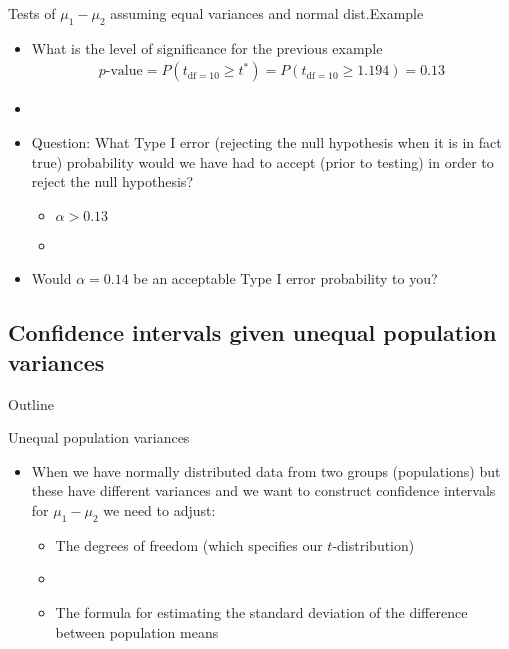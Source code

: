 \documentclass[xcolor=dvipsnames]{beamer}
\begin{document}
\begin{frame}{Tests of $\mu_1 - \mu_2$ assuming equal variances and normal dist.}{Example}
\begin{itemize}
	\item What is the level of significance for the previous example
	\begin{align*}
		p\text{-value}=P(t_{\text{df} = 10} \geq t^*) = P(t_{\text{df} = 10} \geq 1.194) = 0.13
	\end{align*}
	\item[]
	\item Question: What Type I error (rejecting the null hypothesis when it is in fact true) probability would we have had to accept (prior to testing) in order to reject the null hypothesis?
	\begin{itemize}
		\item $\alpha > 0.13$
		\item[]
	\end{itemize}
	\item Would $\alpha = 0.14$ be an acceptable Type I error probability to you?
\end{itemize}
\end{frame}

\subsection{Confidence intervals given unequal population variances}
\begin{frame}{Outline}
\tableofcontents[currentsection,subsectionstyle=show/shaded/hide]
\end{frame}

\begin{frame}{Unequal population variances}
	\begin{itemize}
		\item When we have normally distributed data from two groups (populations) but these have different variances and we want to construct confidence intervals for $\mu_1 -\mu_2$ we need to adjust:
		\begin{itemize}
			\item The degrees of freedom (which specifies our $t$-distribution)
			\item[]
			\item The formula for estimating the standard deviation of the difference between population means

		\end{itemize}
	\end{itemize}
\end{frame}
\end{document}
